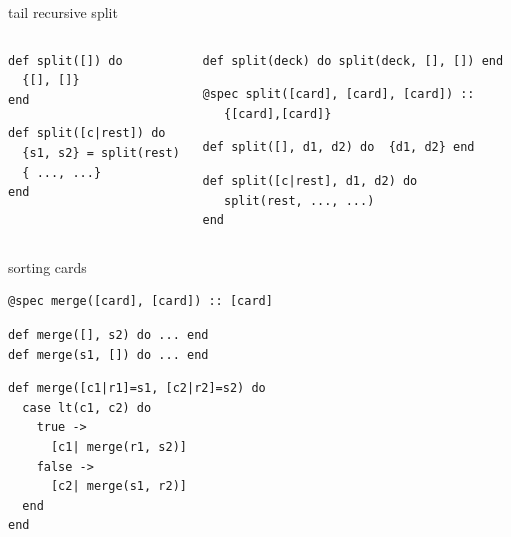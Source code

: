 \begin{frame}[fragile]{tail recursive split}

\begin{columns}

 \begin{column}{0.4\linewidth}
\begin{verbatim}
def split([]) do 
  {[], []} 
end
\end{verbatim}
\pause
\begin{verbatim}
def split([c|rest]) do 
  {s1, s2} = split(rest)
  { ..., ...}
end
\end{verbatim}
 \end{column}
 
 \pause

 \begin{column}{0.6\linewidth}
\begin{verbatim}
def split(deck) do split(deck, [], []) end 
\end{verbatim}
\pause
\begin{verbatim}
@spec split([card], [card], [card]) :: 
   {[card],[card]}
\end{verbatim}   
\pause   

\begin{verbatim}
def split([], d1, d2) do  {d1, d2} end
\end{verbatim}
\pause
\begin{verbatim}
def split([c|rest], d1, d2) do
   split(rest, ..., ...)
end
\end{verbatim}
 \end{column}
\end{columns}

\end{frame}

\begin{frame}[fragile]{sorting cards}

\begin{verbatim}
@spec merge([card], [card]) :: [card]
\end{verbatim}
\pause
\begin{verbatim}
def merge([], s2) do ... end
def merge(s1, []) do ... end
\end{verbatim}
\pause
\begin{verbatim}
def merge([c1|r1]=s1, [c2|r2]=s2) do
  case lt(c1, c2) do
    true ->
      [c1| merge(r1, s2)]
    false ->
      [c2| merge(s1, r2)]     
  end
end
\end{verbatim}

\end{frame}

